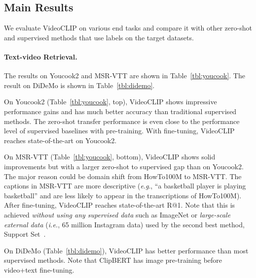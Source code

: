 \documentclass[11pt]{article}
\newcommand{\eg}{\textit{e}.\textit{g}.}
\begin{document}
\subsection{Main Results}
We evaluate VideoCLIP on various end tasks and compare it with other zero-shot and supervised methods that use labels on the target datasets. 

\paragraph{Text-video Retrieval.} The results on Youcook2 and MSR-VTT are shown in Table~\ref{tbl:youcook}. The result on DiDeMo is shown in Table~\ref{tbl:didemo}.


On Youcook2 (Table~\ref{tbl:youcook}, top), VideoCLIP shows impressive performance gains and has much better accuracy than traditional supervised methods. The zero-shot transfer performance is even close to the performance level of supervised baselines with pre-training.
With fine-tuning, VideoCLIP reaches state-of-the-art on Youcook2.

On MSR-VTT (Table~\ref{tbl:youcook}, bottom), VideoCLIP shows solid improvements but with a larger zero-shot to supervised gap than on Youcook2. The major reason could be domain shift from HowTo100M to MSR-VTT. The captions in MSR-VTT are more descriptive (\eg, ``a basketball player is playing basketball'' and are less likely to appear in the transcriptions of HowTo100M). 
After fine-tuning, VideoCLIP reaches state-of-the-art R@1. Note that this is achieved \textit{without using any supervised data} such as ImageNet or \textit{large-scale external data} (\textit{i.e.}, 65 million Instagram data) used by the second best method,  Support Set~\cite{patrick2021supportset}.

\begin{table}[h]

\centering
\setlength\tabcolsep{0.1pt}
\caption{\textit{Textvideo retrieval} on DiDeMo.}
\label{tbl:didemo}
\end{table}
On DiDeMo (Table~\ref{tbl:didemo}), VideoCLIP has better performance than most supervised methods. Note that ClipBERT\cite{lei2021less} has image pre-training before video+text fine-tuning.
\end{document}
